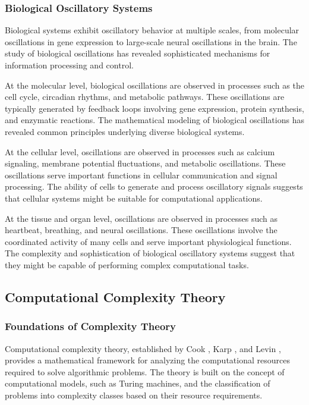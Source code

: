 \documentclass[12pt,a4paper]{article}
\theoremstyle{definition}
\begin{document}
{\subsubsection{Biological Oscillatory Systems}

Biological systems exhibit oscillatory behavior at multiple scales, from molecular oscillations in gene expression to large-scale neural oscillations in the brain. The study of biological oscillations has revealed sophisticated mechanisms for information processing and control.

At the molecular level, biological oscillations are observed in processes such as the cell cycle, circadian rhythms, and metabolic pathways. These oscillations are typically generated by feedback loops involving gene expression, protein synthesis, and enzymatic reactions. The mathematical modeling of biological oscillations has revealed common principles underlying diverse biological systems.

At the cellular level, oscillations are observed in processes such as calcium signaling, membrane potential fluctuations, and metabolic oscillations. These oscillations serve important functions in cellular communication and signal processing. The ability of cells to generate and process oscillatory signals suggests that cellular systems might be suitable for computational applications.

At the tissue and organ level, oscillations are observed in processes such as heartbeat, breathing, and neural oscillations. These oscillations involve the coordinated activity of many cells and serve important physiological functions. The complexity and sophistication of biological oscillatory systems suggest that they might be capable of performing complex computational tasks.

\subsection{Computational Complexity Theory}

\subsubsection{Foundations of Complexity Theory}

Computational complexity theory, established by Cook \cite{cook1971complexity}, Karp \cite{karp1972reducibility}, and Levin \cite{levin1973universal}, provides a mathematical framework for analyzing the computational resources required to solve algorithmic problems. The theory is built on the concept of computational models, such as Turing machines, and the classification of problems into complexity classes based on their resource requirements.

}
\end{document}
